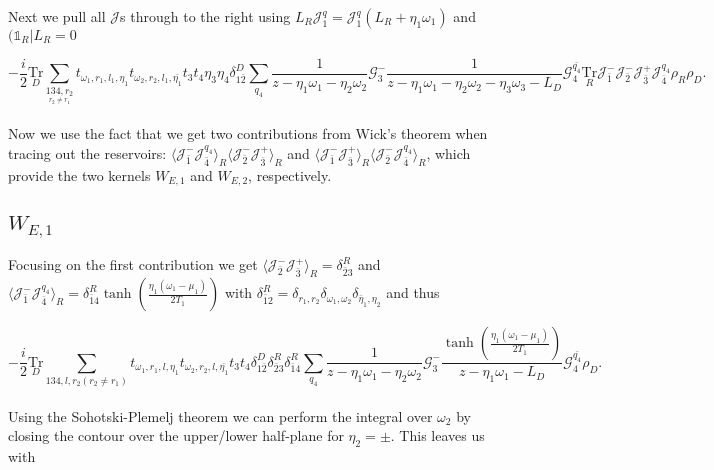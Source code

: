 \documentclass{article}
\newcommand{\bral}[1]{\ensuremath{( #1 |}}
\newcommand{\G}{\ensuremath{\mathcal{G}}}
\newcommand{\J}{\ensuremath{\mathcal{J}}}
\newcommand{\Tru}[1]{\ensuremath{\underset{#1}{\text{Tr}}}}
\begin{document}
Next we pull all $\J$s through to the right using $L_R\J_1^q=\J_1^{q}(L_R+\eta_1\omega_1)$ and $\bral{\mathbb{1}_R}L_R=0$
 
 \begin{equation}
     -\frac{i}{2}\Tru{D} \sum_{\underset{r_2\ne r_1}{134,r_2}}t_{\omega_1, r_1, l_1,\eta_1}t_{\omega_2, r_2, l_1, \bar{\eta_1}}t_3t_4\eta_3\eta_4\delta^D_{1\bar{2}}\sum_{ q_4}\frac{1}{z-\eta_1\omega_1- \eta_2\omega_2}\G^-_3\frac{1}{z-\eta_1\omega_1-\eta_2\omega_2-\eta_3\omega_3-L_D}\G^{\bar{q_4}}_4\Tru{R}\J^-_{\bar{1}}\J^-_{\bar{2}}\J^+_{\bar{3}}\J^{q_4}_{\bar{4}}\rho_R\rho_D.
\end{equation}
 \\
 Now we use the fact that we get two contributions from Wick's theorem when tracing out the reservoirs: $\langle\J^-_{\bar{1}}\J^{q_4}_{\bar{4}}\rangle_R\langle\J^-_{\bar{2}}\J^+_{\bar{3}}\rangle_R$ and $\langle\J^-_{\bar{1}}\J^+_{\bar{3}}\rangle_R\langle\J^-_{\bar{2}}\J^{q_4}_{\bar{4}}\rangle_R$, which provide the two kernels $W_{E,1}$ and $W_{E,2}$, respectively.
 \subsection{$W_{E,1}$}
 
 Focusing on the first contribution we get $\langle\J^-_{\bar{2}}\J^+_{\bar{3}}\rangle_R=\delta_{\bar{2}3}^R$ and $\langle\J^-_{\bar{1}}\J^{q_4}_{\bar{4}}\rangle_R=\delta_{\bar{1}4}^R\tanh\left ( \frac{\eta_1(\omega_1-\mu_1)}{2T_1}\right )$ with $\delta_{\bar{1}2}^R=\delta_{r_1,r_2}\delta_{\omega_1, \omega_2}\delta_{\bar{\eta}_1,\eta_2}$ and thus
 
\begin{equation}
    -\frac{i}{2}\Tru{D} \sum_{134,l,r_2 (r_2\ne r_1)}t_{\omega_1, r_1, l,\eta_1}t_{\omega_2, r_2, l,\bar{\eta_1}}t_3t_4 \delta^D_{1\bar{2}} \delta_{\bar{2}3}^R\delta_{\bar{1}4}^R \sum_{ q_4}\frac{1}{z-\eta_1\omega_1- \eta_2\omega_2}\G^-_3\frac{\tanh\left ( \frac{\eta_1(\omega_1-\mu_1)}{2T_1} \right )}{z-\eta_1\omega_1-L_D}\G^{\bar{q_4}}_4\rho_D.
\end{equation}
\\
Using the Sohotski-Plemelj theorem we can perform the integral over $\omega_2$ by closing the contour over the upper/lower half-plane for $\eta_2=\pm$. This leaves us with 
\end{document}
